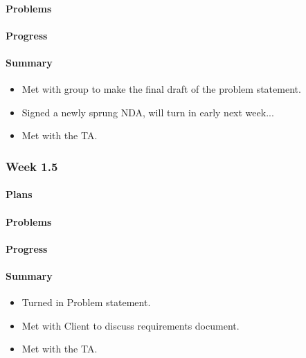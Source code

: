 \documentclass[onecolumn, draftclsnofoot,10pt, compsoc]{article}
\begin{document}
		    \paragraph{Problems} \hfill \break

		    \paragraph{Progress} \hfill \break

		    \paragraph{Summary}
		    	\begin{itemize}
		            \item Met with group to make the final draft of the problem statement.
                    \item Signed a newly sprung NDA, will turn in early next week...
                    \item  Met with the TA.
                \end{itemize}


		\subsubsection{Week 1.5}

		    \paragraph{Plans} \hfill \break

		    \paragraph{Problems} \hfill \break

		    \paragraph{Progress} \hfill \break

		    \paragraph{Summary} \hfill \break
		    	\begin{itemize}
		            \item Turned in Problem statement.
                    \item Met with Client to discuss requirements document.
                    \item Met with the TA.\\
                \end{itemize}
\end{document}
